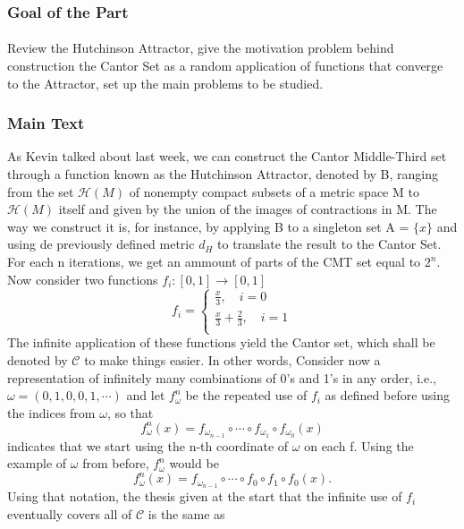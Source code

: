 \documentclass[a4paper]{article}
\theoremstyle{plain}
\theoremstyle{definition}
\begin{document}
 \subsubsection{Goal of the Part} 
  \paragraph{} Review the Hutchinson Attractor, give the motivation problem behind construction the Cantor Set as a random application of functions 
 that converge to the Attractor, set up the main problems to be studied. 
 \subsubsection{Main Text} 
   As Kevin talked about last week, we can construct the Cantor Middle-Third set through a function known as the Hutchinson Attractor, denoted by B, ranging 
 from the set $\mathcal{H}(M)$ of nonempty compact subsets of a metric space M to $\mathcal{H}(M)$ itself and given by the union of the images of  
 contractions in M. The way we construct it is, for instance, by applying B to a singleton set A = $\{x\}$ and using de previously defined metric $d_{H}$ to translate 
 the result to the Cantor Set. For each n iterations, we get an ammount of parts of the CMT set equal to $2^{n}.$  
 Now consider two functions $f_{i}:[0,1]\rightarrow [0, 1]$ 
   $$ 
     f_{i} = \left\{\begin{array}{ll} 
         \frac{x}{3}, \quad i=0\\ 
         \frac{x}{3}+\frac{2}{3}, \quad i=1\\ 
       \end{array}\right. 
   $$ 
   The infinite application of these functions yield the Cantor set, which shall be denoted by $\mathcal{C}$ to make things easier. In other words, 
 Consider now a representation of infinitely many combinations of 0's and 1's in any order, i.e., $\omega = (0, 1, 0, 0, 1, \cdots)$ and 
 let $f_{\omega}^{n}$ be the repeated use of $f_{i}$ as defined before using the indices from $\omega$, so that 
   $$ 
   f_{\omega}^{n}(x) = f_{\omega_{n-1}}\circ{\cdots}\circ{f_{\omega_{1}}}\circ{f_{\omega_{0}}}(x) 
   $$ 
   indicates that we start using the n-th coordinate of $\omega$ on each f. Using the example of $\omega$ from before, $f_{\omega}^{n}$ 
   would be 
   $$ 
     f_{\omega}^{n}(x) = f_{\omega_{n-1}}\circ{\cdots}\circ{f_{0}}\circ{f_{1}}\circ{f_{0}}(x). 
   $$ 
   Using that notation, the thesis given at the start that the infinite use of $f_{i}$ eventually covers all of $\mathcal{C}$ is the same as 
\end{document}
